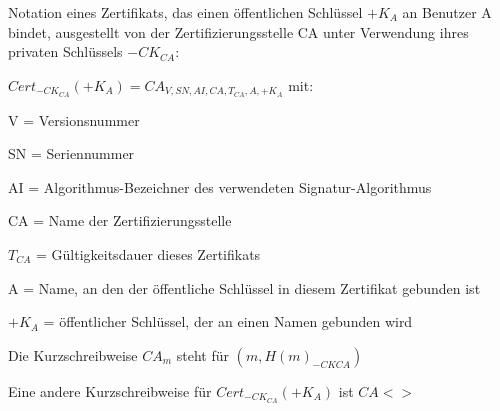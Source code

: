 \documentclass[a4paper]{article}
\begin{document}
\begin{multicols}{3}
      \begin{itemize*}
            \item Notation eines Zertifikats, das einen öffentlichen Schlüssel $+K_A$ an Benutzer A bindet, ausgestellt von der Zertifizierungsstelle CA unter Verwendung ihres privaten Schlüssels $-CK_{CA}$:
            \item $Cert_{-CK_{CA}}(+K_A) = CA_{V, SN, AI, CA, T_{CA}, A, +K_A}$ mit:
            \begin{itemize*}
                  \item V = Versionsnummer
                  \item SN = Seriennummer
                  \item AI = Algorithmus-Bezeichner des verwendeten Signatur-Algorithmus
                  \item CA = Name der Zertifizierungsstelle
                  \item $T_{CA}$ = Gültigkeitsdauer dieses Zertifikats
                  \item A = Name, an den der öffentliche Schlüssel in diesem Zertifikat gebunden ist
                  \item $+K_A$ = öffentlicher Schlüssel, der an einen Namen gebunden wird
            \end{itemize*}
            \item Die Kurzschreibweise $CA_m$ steht für $(m,{H(m)}_{{-CK}{CA}})$
            \item Eine andere Kurzschreibweise für $Cert_{-CK_{CA}}(+K_A)$ ist $CA<>$
      \end{itemize*}


\end{multicols}
\end{document}
